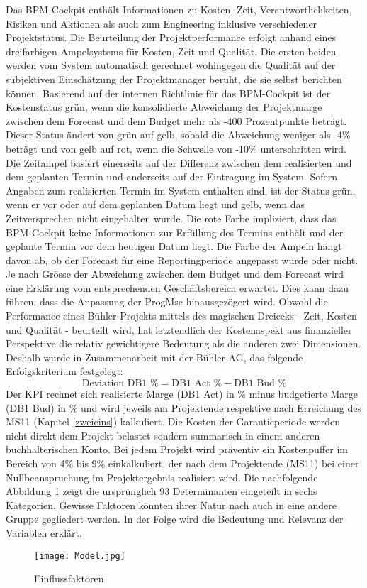 Das BPM-Cockpit enthält Informationen zu Kosten, Zeit, Verantwortlichkeiten, Risiken und Aktionen als auch zum Engineering inklusive verschiedener Projektstatus. Die Beurteilung der Projektperformance erfolgt anhand eines dreifarbigen Ampelsystems für Kosten, Zeit und Qualität. Die ersten beiden werden vom System automatisch gerechnet wohingegen die Qualität auf der subjektiven Einschätzung der Projektmanager beruht, die sie selbst berichten können. Basierend auf der internen Richtlinie für das BPM-Cockpit ist der Kostenstatus grün, wenn die konsolidierte Abweichung der Projektmarge zwischen dem Forecast und dem Budget mehr als -400 Prozentpunkte beträgt. Dieser Status ändert von grün auf gelb, sobald die Abweichung weniger als -4\% beträgt und von gelb auf rot, wenn die Schwelle von -10\% unterschritten wird. Die Zeitampel basiert einerseits auf der Differenz zwischen dem realisierten und dem geplanten Termin und anderseits auf der Eintragung im System. Sofern Angaben zum realisierten Termin im System enthalten sind, ist der Status grün, wenn er vor oder auf dem geplanten Datum liegt und gelb, wenn das Zeitversprechen nicht eingehalten wurde. Die rote Farbe impliziert, dass das BPM-Cockpit keine Informationen zur Erfüllung des Termins enthält und der geplante Termin vor dem heutigen Datum liegt. Die Farbe der Ampeln hängt davon ab, ob der Forecast für eine Reportingperiode angepasst wurde oder nicht. Je nach Grösse der Abweichung zwischen dem Budget und dem Forecast wird eine Erklärung vom entsprechenden Geschäftsbereich erwartet. Dies kann dazu führen, dass die Anpassung der ProgMse hinausgezögert wird.
\newline
Obwohl die Performance eines Bühler-Projekts mittels des magischen Dreiecks - Zeit, Kosten und Qualität - beurteilt wird, hat letztendlich der Kostenaspekt aus finanzieller Perspektive die relativ gewichtigere Bedeutung als die anderen zwei Dimensionen. Deshalb wurde in Zusammenarbeit mit der Bühler AG, das folgende Erfolgskriterium festgelegt:
\begin{equation}
	\text{Deviation DB1 \%} = \text{DB1 Act \%} - \text{DB1 Bud \%}
\end{equation}
Der KPI rechnet sich realisierte Marge (DB1 Act) in \% minus budgetierte Marge (DB1 Bud) in \% und wird jeweils am Projektende respektive nach Erreichung des MS11 (Kapitel \ref{zweieins}) kalkuliert. Die Kosten der Garantieperiode werden nicht direkt dem Projekt belastet sondern summarisch in einem anderen buchhalterischen Konto. Bei jedem Projekt wird präventiv ein Kostenpuffer im Bereich von 4\% bis 9\% einkalkuliert, der nach dem Projektende (MS11) bei einer Nullbeanspruchung im Projektergebnis realisiert wird.
\newline Die nachfolgende Abbildung \ref{Einflussfaktoren} zeigt die ursprünglich 93 Determinanten eingeteilt in sechs Kategorien. Gewisse Faktoren könnten ihrer Natur nach auch in eine andere Gruppe gegliedert werden. In der Folge wird die Bedeutung und Relevanz der Variablen erklärt.
\begin{figure}[H]
	\centering
	\texttt{[image: Model.jpg]}
	\caption{Einflussfaktoren
	\label{Einflussfaktoren}}
\end{figure}
